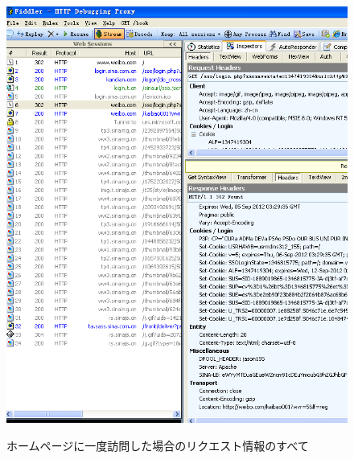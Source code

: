 \begin{figure}[H]
  \includegraphics[width=14cm]{3.1.response.png}
   \label{図3.6}
   \caption{ホームページに一度訪問した場合のリクエスト情報のすべて}
\end{figure}



